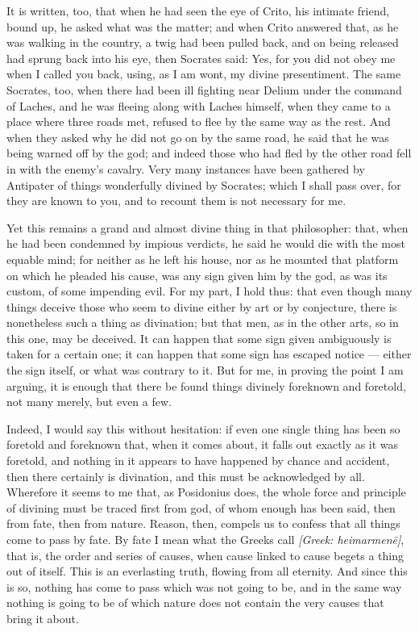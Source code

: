  It is written, too, that when he had seen the eye of Crito, his intimate friend, bound up, he asked what was the matter; and when Crito answered that, as he was walking in the country, a twig had been pulled back, and on being released had sprung back into his eye, then Socrates said: Yes, for you did not obey me when I called you back, using, as I am wont, my divine presentiment. The same Socrates, too, when there had been ill fighting near Delium under the command of Laches, and he was fleeing along with Laches himself, when they came to a place where three roads met, refused to flee by the same way as the rest. And when they asked why he did not go on by the same road, he said that he was being warned off by the god; and indeed those who had fled by the other road fell in with the enemy's cavalry. Very many instances have been gathered by Antipater of things wonderfully divined by Socrates; which I shall pass over, for they are known to you, and to recount them is not necessary for me.

 Yet this remains a grand and almost divine thing in that philosopher: that, when he had been condemned by impious verdicts, he said he would die with the most equable mind; for neither as he left his house, nor as he mounted that platform on which he pleaded his cause, was any sign given him by the god, as was its custom, of some impending evil. For my part, I hold thus: that even though many things deceive those who seem to divine either by art or by conjecture, there is nonetheless such a thing as divination; but that men, as in the other arts, so in this one, may be deceived. It can happen that some sign given ambiguously is taken for a certain one; it can happen that some sign has escaped notice — either the sign itself, or what was contrary to it. But for me, in proving the point I am arguing, it is enough that there be found things divinely foreknown and foretold, not many merely, but even a few.

 Indeed, I would say this without hesitation: if even one single thing has been so foretold and foreknown that, when it comes about, it falls out exactly as it was foretold, and nothing in it appears to have happened by chance and accident, then there certainly is divination, and this must be acknowledged by all. Wherefore it seems to me that, as Posidonius does, the whole force and principle of divining must be traced first from god, of whom enough has been said, then from fate, then from nature. Reason, then, compels us to confess that all things come to pass by fate. By fate I mean what the Greeks call \textit{[Greek: heimarmenē]}, that is, the order and series of causes, when cause linked to cause begets a thing out of itself. This is an everlasting truth, flowing from all eternity. And since this is so, nothing has come to pass which was not going to be, and in the same way nothing is going to be of which nature does not contain the very causes that bring it about.

